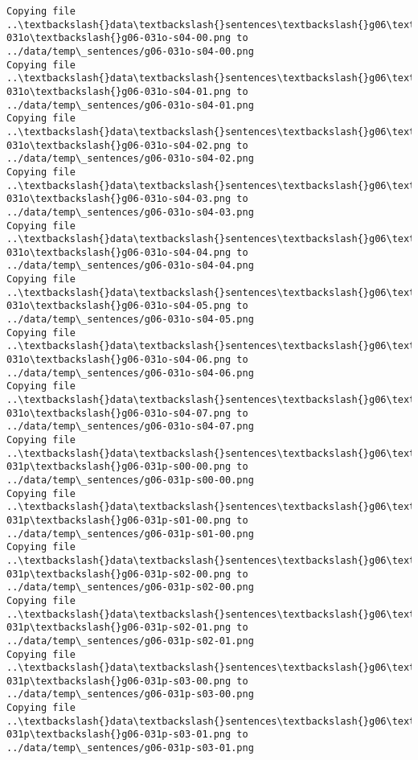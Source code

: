 \documentclass[11pt]{article}
\begin{document}
\begin{Verbatim}[commandchars=\\\{\}]
Copying file ..\textbackslash{}data\textbackslash{}sentences\textbackslash{}g06\textbackslash{}g06-031o\textbackslash{}g06-031o-s04-00.png to
../data/temp\_sentences/g06-031o-s04-00.png
Copying file ..\textbackslash{}data\textbackslash{}sentences\textbackslash{}g06\textbackslash{}g06-031o\textbackslash{}g06-031o-s04-01.png to
../data/temp\_sentences/g06-031o-s04-01.png
Copying file ..\textbackslash{}data\textbackslash{}sentences\textbackslash{}g06\textbackslash{}g06-031o\textbackslash{}g06-031o-s04-02.png to
../data/temp\_sentences/g06-031o-s04-02.png
Copying file ..\textbackslash{}data\textbackslash{}sentences\textbackslash{}g06\textbackslash{}g06-031o\textbackslash{}g06-031o-s04-03.png to
../data/temp\_sentences/g06-031o-s04-03.png
Copying file ..\textbackslash{}data\textbackslash{}sentences\textbackslash{}g06\textbackslash{}g06-031o\textbackslash{}g06-031o-s04-04.png to
../data/temp\_sentences/g06-031o-s04-04.png
Copying file ..\textbackslash{}data\textbackslash{}sentences\textbackslash{}g06\textbackslash{}g06-031o\textbackslash{}g06-031o-s04-05.png to
../data/temp\_sentences/g06-031o-s04-05.png
Copying file ..\textbackslash{}data\textbackslash{}sentences\textbackslash{}g06\textbackslash{}g06-031o\textbackslash{}g06-031o-s04-06.png to
../data/temp\_sentences/g06-031o-s04-06.png
Copying file ..\textbackslash{}data\textbackslash{}sentences\textbackslash{}g06\textbackslash{}g06-031o\textbackslash{}g06-031o-s04-07.png to
../data/temp\_sentences/g06-031o-s04-07.png
Copying file ..\textbackslash{}data\textbackslash{}sentences\textbackslash{}g06\textbackslash{}g06-031p\textbackslash{}g06-031p-s00-00.png to
../data/temp\_sentences/g06-031p-s00-00.png
Copying file ..\textbackslash{}data\textbackslash{}sentences\textbackslash{}g06\textbackslash{}g06-031p\textbackslash{}g06-031p-s01-00.png to
../data/temp\_sentences/g06-031p-s01-00.png
Copying file ..\textbackslash{}data\textbackslash{}sentences\textbackslash{}g06\textbackslash{}g06-031p\textbackslash{}g06-031p-s02-00.png to
../data/temp\_sentences/g06-031p-s02-00.png
Copying file ..\textbackslash{}data\textbackslash{}sentences\textbackslash{}g06\textbackslash{}g06-031p\textbackslash{}g06-031p-s02-01.png to
../data/temp\_sentences/g06-031p-s02-01.png
Copying file ..\textbackslash{}data\textbackslash{}sentences\textbackslash{}g06\textbackslash{}g06-031p\textbackslash{}g06-031p-s03-00.png to
../data/temp\_sentences/g06-031p-s03-00.png
Copying file ..\textbackslash{}data\textbackslash{}sentences\textbackslash{}g06\textbackslash{}g06-031p\textbackslash{}g06-031p-s03-01.png to
../data/temp\_sentences/g06-031p-s03-01.png

\end{Verbatim}
\end{document}
